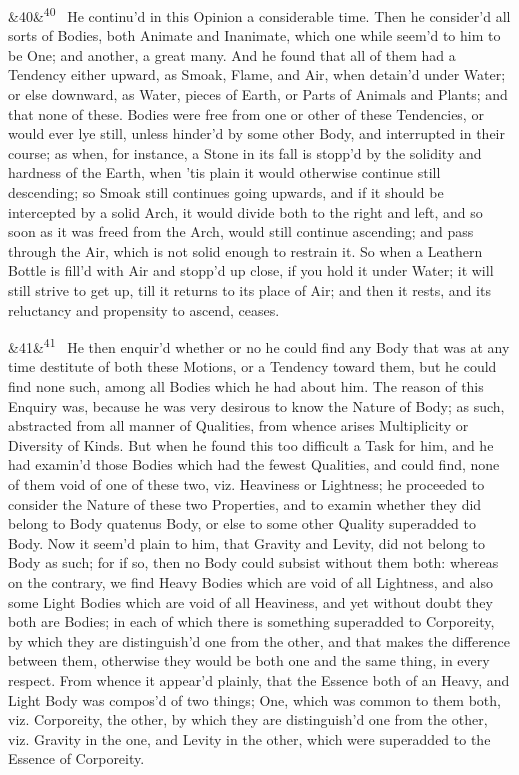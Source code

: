 \documentclass[12pt]{article}
\newcommand{\para}[1][]{\par\noindent\ifx&#1&\else\textsuperscript{\footnotesize #1}~\fi}
\begin{document}
\para[40] He continu'd in this Opinion a considerable time. Then he consider'd all sorts of Bodies, both Animate and Inanimate, which one while seem'd to him to be One; and another, a great many. And he found that all of them had a Tendency either upward, as Smoak, Flame, and Air, when detain'd under Water; or else downward, as Water, pieces of Earth, or Parts of Animals and Plants; and that none of these. Bodies were free from one or other of these Tendencies, or would ever lye still, unless hinder'd by some other Body, and interrupted in their course; as when, for instance, a Stone in its fall is stopp'd by the solidity and hardness of the Earth, when 'tis plain it would otherwise continue still descending; so Smoak still continues going upwards, and if it should be intercepted by a solid Arch, it would divide both to the right and left, and so soon as it was freed from the Arch, would still continue ascending; and pass through the Air, which is not solid enough to restrain it. So when a Leathern Bottle is fill'd with Air and stopp'd up close, if you hold it under Water; it will still strive to get up, till it returns to its place of Air; and then it rests, and its reluctancy and propensity to ascend, ceases.

\para[41] He then enquir'd whether or no he could find any Body that was at any time destitute of both these Motions, or a Tendency toward them, but he could find none such, among all Bodies which he had about him. The reason of this Enquiry was, because he was very desirous to know the Nature of Body; as such, abstracted from all manner of Qualities, from whence arises Multiplicity or Diversity of Kinds. But when he found this too difficult a Task for him, and he had examin'd those Bodies which had the fewest Qualities, and could find, none of them void of one of these two, viz. Heaviness or Lightness; he proceeded to consider the Nature of these two Properties, and to examin whether they did belong to Body quatenus Body, or else to some other Quality superadded to Body. Now it seem'd plain to him, that Gravity and Levity, did not belong to Body as such; for if so, then no Body could subsist without them both: whereas on the contrary, we find Heavy Bodies which are void of all Lightness, and also some Light Bodies which are void of all Heaviness, and yet without doubt they both are Bodies; in each of which there is something superadded to Corporeity, by which they are distinguish'd one from the other, and that makes the difference between them, otherwise they would be both one and the same thing, in every respect. From whence it appear'd plainly, that the Essence both of an Heavy, and Light Body was compos'd of two things; One, which was common to them both, viz. Corporeity, the other, by which they are distinguish'd one from the other, viz. Gravity in the one, and Levity in the other, which were superadded to the Essence of Corporeity.
\end{document}
